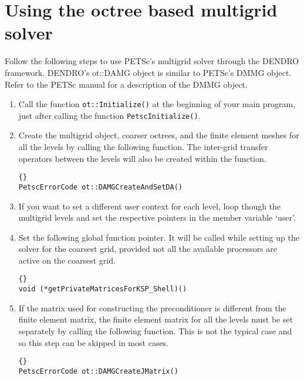 \documentclass[10pt,reqno,a4paper]{report}
\numberwithin{equation}{section}
\begin{document}
\chapter{Using the octree based multigrid solver}
\label{chp:multigrid}
Follow the following steps to use PETSc's multigrid solver through the DENDRO framework. DENDRO's ot::DAMG object is similar to PETSc's DMMG object. Refer to the PETSc manual for a description of the DMMG object.
\begin{enumerate}
\item Call the function \lstinline[basicstyle=\bfseries]!ot::Initialize()! at the beginning of your main program, just after calling the function  \lstinline[basicstyle=\bfseries]!PetscInitialize()!.

\item Create the multigrid object, coarser octrees, and the finite element meshes for all the levels by calling the following function. The inter-grid transfer operators between the levels will also be created within the function.

\begin{lstlisting}[frame=trbl]{}
PetscErrorCode ot::DAMGCreateAndSetDA()
\end{lstlisting}

\item If you want to set a different user context for each level, loop though the multigrid levels and set the respective pointers in the member variable `user'. 

\item Set the following global function pointer. It will be called while setting up the solver for the coarsest grid, provided not all the available processors are active on the coarsest grid.

\begin{lstlisting}[frame=trbl]{}
void (*getPrivateMatricesForKSP_Shell)()
\end{lstlisting}

\item If the matrix used for constructing the preconditioner is different from the finite element matrix, the finite element matrix for all the levels must be set separately by calling the following function. This is not the typical case and so this step can be skipped in most cases.

\begin{lstlisting}[frame=trbl]{}
PetscErrorCode ot::DAMGCreateJMatrix()
\end{lstlisting}


\end{enumerate}
\end{document}
